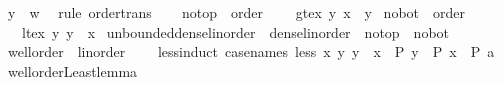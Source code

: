 \begin{isabellebody}
\ {\isachardoublequoteopen}y\ {\isasymle}\ w{\isachardoublequoteclose}\ \isamarkupfalse%
\ {\isacharparenleft}{\kern0pt}rule\ order{\isacharunderscore}{\kern0pt}trans{\isacharparenright}{\kern0pt}\isanewline
\ \ \isamarkupfalse%
\isanewline
{}\isamarkupfalse%
%
\endisatagproof
{\isafoldproof}%
%
\isadelimproof
\isanewline
%
\endisadelimproof
\isanewline
{}\isamarkupfalse%
\isanewline
\isanewline
{}\isamarkupfalse%
\ no{\isacharunderscore}{\kern0pt}top\ {\isacharequal}{\kern0pt}\ order\ {\isacharplus}{\kern0pt}\isanewline
\ \ \ gt{\isacharunderscore}{\kern0pt}ex{\isacharcolon}{\kern0pt}\ {\isachardoublequoteopen}{\isasymexists}y{\isachardot}{\kern0pt}\ x\ {\isacharless}{\kern0pt}\ y{\isachardoublequoteclose}\isanewline
\isanewline
{}\isamarkupfalse%
\ no{\isacharunderscore}{\kern0pt}bot\ {\isacharequal}{\kern0pt}\ order\ {\isacharplus}{\kern0pt}\isanewline
\ \ \ lt{\isacharunderscore}{\kern0pt}ex{\isacharcolon}{\kern0pt}\ {\isachardoublequoteopen}{\isasymexists}y{\isachardot}{\kern0pt}\ y\ {\isacharless}{\kern0pt}\ x{\isachardoublequoteclose}\isanewline
\isanewline
{}\isamarkupfalse%
\ unbounded{\isacharunderscore}{\kern0pt}dense{\isacharunderscore}{\kern0pt}linorder\ {\isacharequal}{\kern0pt}\ dense{\isacharunderscore}{\kern0pt}linorder\ {\isacharplus}{\kern0pt}\ no{\isacharunderscore}{\kern0pt}top\ {\isacharplus}{\kern0pt}\ no{\isacharunderscore}{\kern0pt}bot%
\isadelimdocument
%
\endisadelimdocument
%
\isatagdocument
%
\isamarkuptrue%
%
\endisatagdocument
{\isafolddocument}%
%
\isadelimdocument
%
\endisadelimdocument
{}\isamarkupfalse%
\ wellorder\ {\isacharequal}{\kern0pt}\ linorder\ {\isacharplus}{\kern0pt}\isanewline
\ \ \ less{\isacharunderscore}{\kern0pt}induct\ {\isacharbrackleft}{\kern0pt}case{\isacharunderscore}{\kern0pt}names\ less{\isacharbrackright}{\kern0pt}{\isacharcolon}{\kern0pt}\ {\isachardoublequoteopen}{\isacharparenleft}{\kern0pt}{\isasymAnd}x{\isachardot}{\kern0pt}\ {\isacharparenleft}{\kern0pt}{\isasymAnd}y{\isachardot}{\kern0pt}\ y\ {\isacharless}{\kern0pt}\ x\ {\isasymLongrightarrow}\ P\ y{\isacharparenright}{\kern0pt}\ {\isasymLongrightarrow}\ P\ x{\isacharparenright}{\kern0pt}\ {\isasymLongrightarrow}\ P\ a{\isachardoublequoteclose}\isanewline
{}\isanewline
\isanewline
{}\isamarkupfalse%
\ wellorder{\isacharunderscore}{\kern0pt}Least{\isacharunderscore}{\kern0pt}lemma{\isacharcolon}{\kern0pt}\isanewline

\end{isabellebody}
